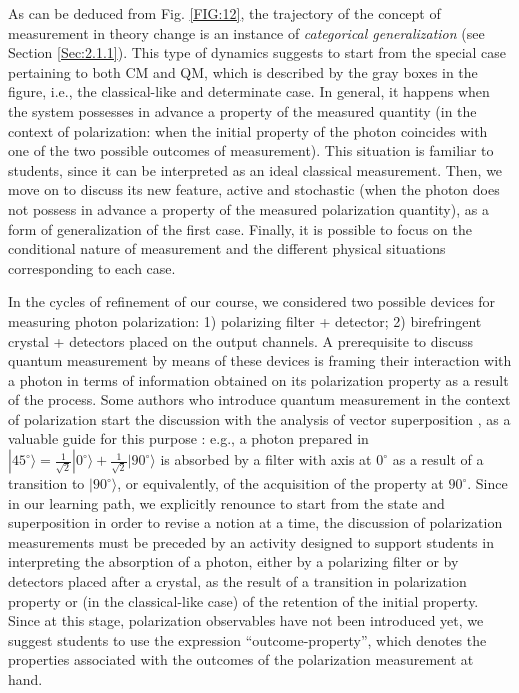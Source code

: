 \documentclass[twocolumn,secnumarabic,amssymb, nobibnotes, aps, prd, nofootinbib]{revtex4-2}
\begin{document}
As can be deduced from Fig. \ref{FIG:12}, the trajectory of the concept of measurement in theory change is an instance of \emph{categorical generalization} (see Section \ref{Sec:2.1.1}). This type of dynamics suggests to start from the special case pertaining to both CM and QM, which is described by the gray boxes in the figure, i.e., the classical-like and determinate case. In general, it happens when the system possesses in advance a property of the measured quantity (in  the context of polarization: when the initial property of the photon coincides with one of the two possible outcomes of measurement). This situation is familiar to students, since it can be interpreted as an ideal classical measurement. Then, we move on to discuss its new feature, active and stochastic (when the photon does not possess in advance a property of the measured polarization quantity), as a form of generalization of the first case. Finally, it is possible to focus on the conditional nature of measurement and the different physical situations corresponding to each case.

In the cycles of refinement of our course, we considered two possible devices for measuring photon polarization: 1) polarizing filter + detector; 2) birefringent crystal + detectors placed on the output channels. A prerequisite to discuss quantum measurement by means of these devices is framing their interaction with a photon in terms of information obtained on its polarization property as a result of the process. Some authors who introduce quantum measurement in the context of polarization start the discussion with the analysis of vector superposition \cite{Heyde2020, Michelini2019}, as a valuable guide for this purpose : e.g., a photon prepared in $|45^{\circ}\rangle=\frac{1}{\sqrt{2}}|0^{\circ}\rangle+\frac{1}{\sqrt{2}}|90^{\circ}\rangle$ is absorbed by a filter with axis at $0^{\circ}$ as a result of a transition to $|90^{\circ}\rangle$, or equivalently, of the acquisition of the property at $90^{\circ}$. Since in our learning path, we explicitly renounce to start from the state and superposition in order to revise a notion at a time, the discussion of polarization measurements must be preceded by an activity designed to support students in interpreting the absorption of a photon, either by a polarizing filter or by detectors placed after a crystal, as the result of a transition in polarization property or (in the classical-like case) of the retention of the initial property. Since at this stage, polarization observables have not been introduced yet, we suggest students to use the expression ``outcome-property'', which denotes the properties associated with the outcomes of the polarization measurement at hand.
\end{document}
